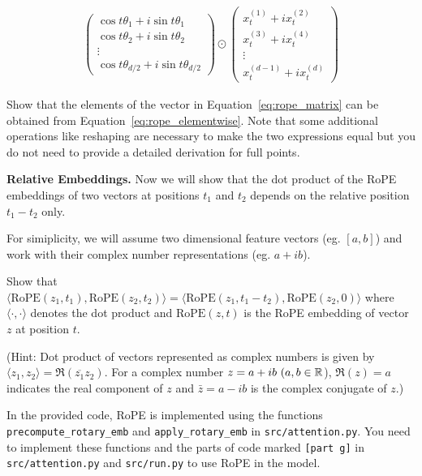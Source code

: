 \begin{parts}
\begin{subparts}
\begin{align}\label{eq:rope_elementwise}
    \begin{pmatrix}
        \cos t\theta_1 + i\sin t\theta_1 \\
        \cos t\theta_2 + i\sin t\theta_2 \\
        \vdots \\
        \cos t\theta_{d/2} + i\sin t\theta_{d/2}
    \end{pmatrix}
    \odot
    \begin{pmatrix}
        x^{(1)}_t + i x^{(2)}_t \\
        x^{(3)}_t + i x^{(4)}_t \\
        \vdots \\
        x^{(d-1)}_t + i x^{(d)}_t
    \end{pmatrix}
\end{align}

Show that the elements of the vector in Equation~\ref{eq:rope_matrix} can be obtained from Equation~\ref{eq:rope_elementwise}. Note that some additional operations like reshaping are necessary to make the two expressions equal but you do not need to provide a detailed derivation for full points. 

\ifans{}

\subpart[1] \textbf{Relative Embeddings.} Now we will show that the dot product of the RoPE embeddings of two vectors at positions $t_1$ and $t_2$ depends on the relative position $t_1 - t_2$ only. 

For simiplicity, we will assume two dimensional feature vectors (eg. $[a, b]$) and work with their complex number representations (eg. $a + ib$).

Show that $\langle \text{RoPE}(z_1, t_1), \text{RoPE}(z_2, t_2) \rangle = \langle \text{RoPE}(z_1, t_1 - t_2), \text{RoPE}(z_2, 0) \rangle$ where $\langle \cdot, \cdot \rangle$ denotes the dot product and $\text{RoPE}(z, t)$ is the RoPE embedding of vector $z$ at position $t$.

(Hint: Dot product of vectors represented as complex numbers is given by $\langle z_1, z_2 \rangle = \Re(\overline{z_1} z_2)$. For a complex number $z = a + ib\ (a,b\in\R$), $\Re(z) = a$ indicates the real component of $z$ and $\bar{z} = a - ib$ is the complex conjugate of $z$.)

\ifans{}


\subpart[8] In the provided code, RoPE is implemented using the functions \texttt{precompute\_rotary\_emb} and \texttt{apply\_rotary\_emb} in \texttt{src/attention.py}. You need to implement these functions and the parts of code marked \texttt{[part g]} in \texttt{src/attention.py} and \texttt{src/run.py} to use RoPE in the model.


\end{subparts}
\end{parts}
